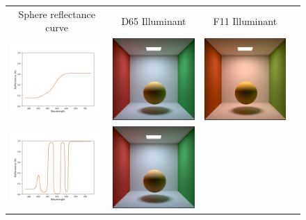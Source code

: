 \begin{itemize}
\begin{figure}[t]
	\centering
	{\sffamily
		\begin{tabular}{cccc}
			Sphere reflectance curve & D65 Illuminant & F11 Illuminant 
			\vspace{1em} \\
			\includegraphics[width=.30\linewidth]{img/metamerism_first_curve.png}
			&
			\includegraphics[width=.30\linewidth]{img/metamerism_first_d65.png}
			& 
			\includegraphics[width=.30\linewidth]{img/metamerism_first_fl11.png}
			\vspace{1em} \\
			\includegraphics[width=.30\linewidth]{img/metamerism_second_curve.png}
			&
			\includegraphics[width=.30\linewidth]{img/metamerism_second_d65.png}

\end{tabular}}
\end{figure}
\end{itemize}
